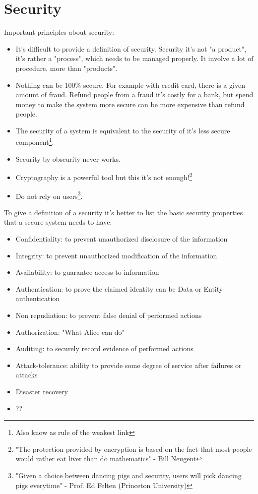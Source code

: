 \section{Security}
Important principles about security:
\begin{itemize}
  \item It's difficult to provide a definition of security. Security it's not "a
  product", it's rather a "process", which needs to be managed properly. It
  involve a lot of procedure, more than "products".
  \item Nothing can be 100\% secure.
  For example with credit card, there is a given amount of fraud. Refund people
  from a fraud it's costly for a bank, but spend money to make the system more
  secure can be more expensive than refund people.
  \item The security of a system is equivalent to the security of it's less
secure component\footnote{Also know as rule of the weakest link}.
  \item Security by obscurity never works.
  \item Cryptography is a powerful tool but this it's not enough!\footnote{"The
protection provided by encryption is based on the fact that most people would
rather eat liver than do mathematics" - Bill Neugent}
  \item Do not rely on users\footnote{"Given a choice between dancing pigs and
security, users will pick dancing pigs everytime" - Prof. Ed Felten (Princeton
University)}.
\end{itemize}
To give a definition of a security it's better to list the basic security
properties that a secure system needs to have:
\begin{itemize}
  \item Confidentiality: to prevent unauthorized disclosure of the information
  \item Integrity: to prevent unauthorized modification of the information
  \item Availability: to guarantee access to information
  \item Authentication: to prove the claimed identity can be Data or Entity
authentication
  \item Non repudiation: to prevent false denial of performed actions
  \item Authorization: "What Alice can do"
  \item Auditing: to securely record evidence of performed actions
  \item Attack-tolerance: ability to provide some degree of service after
failures or attacks
  \item Disaster recovery
  \item ??
\end{itemize}

